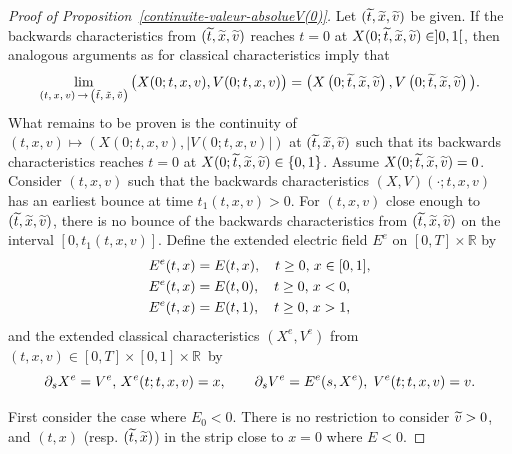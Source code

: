 \documentclass[AHL,Unicode,longabstracts,published]{cedram}
\newcommand{\R}{\mathbb{R}}
\let\oldtilde\tilde
\renewcommand*{\tilde}[1]{\mathchoice{\widetilde{#1}}{\widetilde{#1}}{\oldtilde{#1}}{\oldtilde{#1}}}
\begin{document}
\begin{proof}[{Proof of Proposition~\ref{continuite-valeur-absolueV(0)}}]
Let $(\tilde{t},\tilde{x},\tilde{v})$ be given. If the backwards characteristics from $(\tilde{t},\tilde{x},\tilde{v})$ reaches $t= 0$ at $X(0;\tilde{t},\tilde{x},\tilde{v})\in]0,1[$, then analogous arguments as for classical characteristics imply that
\[
\lim _{(t,\,x,\,v)\,\rightarrow\,\left(\tilde{t},\,\tilde{x},\,\tilde{v}\right)}\big(X(0;t,x,v), V(0;t,x,v)\big) = \big(X\left(0;\tilde{t},\tilde{x},\tilde{v}\right), V\left(0;\tilde{t},\tilde{x},\tilde{v}\right)\big).
\]
What remains to be proven is the continuity of $(t,x,v) \mapsto (X(0;t,x,v),|V(0;t,x,v)|)$ at $(\tilde{t},\tilde{x},\tilde{v})$ such that its backwards characteristics reaches $t= 0$ at $X(0;\tilde{t},\tilde{x},\tilde{v})\in \{ 0,1\} $. Assume $X(0;\tilde{t},\tilde{x},\tilde{v})= 0$. Consider $(t,x,v)$ such that the backwards characteristics $(X,V)(\cdot;t,x,v)$ has an earliest bounce at time $t_1(t,x,v)>0$. For $(t,x,v)$ close enough to $(\tilde{t},\tilde{x},\tilde{v})$, there is no bounce of the backwards characteristics from $(\tilde{t},\tilde{x},\tilde{v})$ on the interval $[0,t_1(t,x,v)]$. Define the extended electric field $E^e$ on $[0,T] \times
\R $ by
\begin{align*}
E^e(t,x) &= E(t,x),\quad t\geq0,\hspace*{0.02in}x\in [0,1],\\
E^e(t,x) &= E(t,0),\quad t\geq 0,\hspace*{0.02in}x<0,\\
E^e(t,x) &= E(t,1),\quad t\geq 0,\hspace*{0.02in}x>1,
\end{align*}
and the extended classical characteristics $(X^e,V^e)$ from $(t,x,v)\in [0,T]
\times [0,1] \times \R $~by
\[
\partial _sX^e= V^e,\hspace*{0.02in} X^e(t;t,x,v)= x,\quad \quad \partial _sV^e= E^e(s,X^e),\; V^e(t;t,x,v)= v.
\]

First consider the case where $E_0<0$. There is no restriction to consider $\tilde{v}>0$, and $(t,x)$ (resp. $(\tilde{t},\tilde{x})$) in the strip close to $x=0$ where $E<0$. 



\end{proof}
\end{document}
